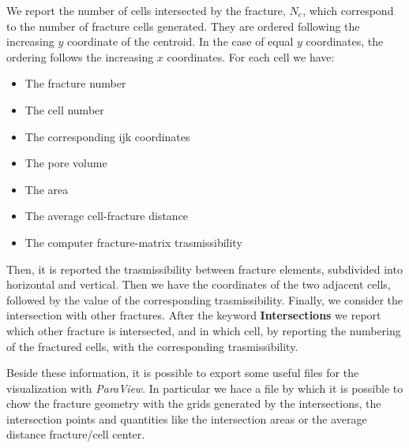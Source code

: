 \documentclass[12pt,twoside]{article}
\begin{document}
We report the number of cells intersected by the fracture, $N_e$, which correspond to the number of fracture cells generated. 
They are ordered following the increasing $y$ coordinate of the centroid. 
In the case of equal $y$ coordinates, the ordering follows the increasing $x$ coordinates.
For each cell we have:
\begin{itemize}
 \item The fracture number
 \item The cell number
 \item The corresponding ijk coordinates
 \item The pore volume
 \item The area
 \item The average cell-fracture distance
 \item The computer fracture-matrix trasmissibility
\end{itemize}

Then, it is reported the trasmissibility between fracture elements, subdivided into horizontal and vertical.
Then we have the coordinates of the two adjacent cells, followed by the value of the corresponding trasmissibility.
Finally, we consider the intersection with other fractures. After the keyword
\textbf{Intersections} we report which other fracture is intersected, and in which cell, by reporting the numbering of the fractured cells, with the corresponding trasmissibility.

Beside these information, it is possible to export some useful files for the visualization with \emph{ParaView}. In particular we hace a file by which it is possible to chow the fracture geometry with the grids generated by the intersections, the intersection points and quantities like the intersection areas or the average distance fracture/cell center.
\end{document}
